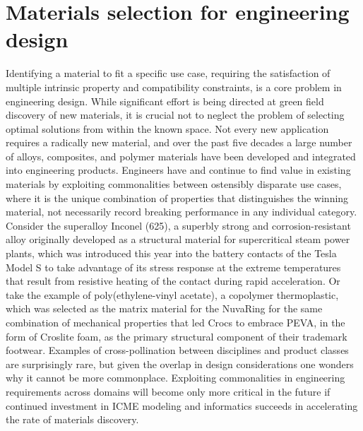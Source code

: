 
\section{Materials selection for engineering design}

Identifying a material to fit a specific use case, requiring the satisfaction of multiple intrinsic property and compatibility constraints, is a core problem in engineering design. 
While significant effort is being directed at green field discovery of new materials, it is crucial not to neglect the problem of selecting optimal solutions from within the known space. 
Not every new application requires a radically new material, and over the past five decades a large number of alloys, composites, and polymer materials have been developed and integrated into engineering products. 
Engineers have and continue to find value in existing materials by exploiting commonalities between ostensibly disparate use cases, where it is the unique combination of properties that distinguishes the winning material, not necessarily record breaking performance in any individual category.
Consider the superalloy Inconel (625), a superbly strong and corrosion-resistant alloy originally developed as a structural material for supercritical steam power plants\cite{Eiselstein1991}, which was introduced this year into the battery contacts of the Tesla\textsuperscript{\textregistered} Model S to take advantage of its stress response at the extreme temperatures that result from resistive heating of the contact during rapid acceleration\cite{Musk2015}.
Or take the example of poly(ethylene-vinyl acetate), a copolymer thermoplastic, which was selected as the matrix material for the NuvaRing\cite{Sarkar2005} for the same combination of mechanical properties that led Crocs\textsuperscript{\texttrademark} to embrace PEVA, in the form of Croslite\textsuperscript{\textregistered} foam, as the primary structural component of their trademark footwear. 
Examples of cross-pollination between disciplines and product classes are surprisingly rare, but given the overlap in design considerations one wonders why it cannot be more commonplace. 
Exploiting commonalities in engineering requirements across domains will become only more critical in the future if continued investment in ICME modeling and informatics succeeds in accelerating the rate of materials discovery. 

